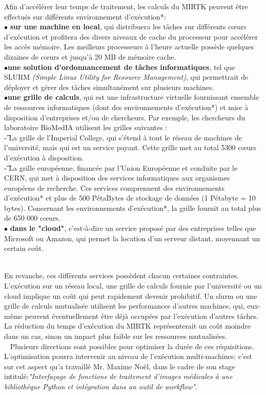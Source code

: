 \documentclass[10pt]{report}
\begin{document}
	Afin d'accélérer leur temps de traitement, les calculs du MIRTK peuvent être effectués sur différents environnement d'exécution*:
	\\{$\bullet$}\textbf{ sur une machine en local}, 
	qui distribuera les tâches sur différents cœurs d'exécution et profitera des divers niveaux de cache du processeur pour accélérer les accès mémoire. Les meilleurs processeurs à l'heure actuelle possède quelques dizaines de cœurs et jusqu'à 20 MB de mémoire cache.
	\\{$\bullet$}\textbf{une solution d'ordonnancement de tâches informatiques}, tel que SLURM \textit{(Simple Linux Utility for Resource Management)}, qui permettrait de déployer et gérer des tâches simultanément sur plusieurs machines. 
	\\{$\bullet$}\textbf{une grille de calculs}, qui est une infrastructure virtuelle fournissant ensemble de ressources informatiques (dont des environnements d'exécution*) et mise à disposition d'entreprises et/ou de chercheurs. \newline
	Par exemple, les chercheurs du laboratoire BioMedIA utilisent les grilles suivantes : \\
	\t - La grille de l'Imperial College, qui s'étend à tout le réseau de machines de l'université, mais qui est un service payant. Cette grille met au total 5300 cœurs d'exécution à disposition.\\
	\t - La grille européenne, financée par l'Union Européenne et conduite par le CERN, qui met à disposition des services informatiques aux organismes européens de recherche. Ces services comprennent des environnements d'exécution* et plus de 500 PétaBytes de stockage de données (1 Pétabyte = 10 bytes). Concernant les environnements d'exécution*, la grille fournit au total plus de 650 000 cœurs.
	\\{$\bullet$}\textbf{ dans le "cloud"}, c'est-à-dire un service proposé par des entreprises telles que Microsoft ou Amazon, qui permet la location d'un serveur distant, moyennant un certain coût. \\ ~\par
	En revanche, ces différents services possèdent chacun certaines contraintes. L'exécution sur un réseau local, une grille de calculs fournie par l'université ou un cloud implique un coût qui peut rapidement devenir prohibitif. Un slurm ou une grille de calculs mutualisée utilisent les performances d'autres machines, qui, eux-même peuvent éventuellement être déjà occupées par l'exécution d'autres tâches. La réduction du temps d'exécution du MIRTK représenterait un coût moindre dans un cas, sinon un impact plus faible sur les ressources mutualisées.\\ 
	Plusieurs directions sont possibles pour optimiser la durée de ces réquisitions. L'optimisation pourra intervenir au niveau de l'exécution multi-machines: c'est sur cet aspect qu'a travaillé Mr. Maxime Noël, dans le cadre de son stage intitulé:\textit{"Interfaçage de fonctions de traitement d'images médicales à une bibliothèque Python et intégration dans un outil de workflow"}.\\
	\vspace{-0.7cm}
\end{document}
